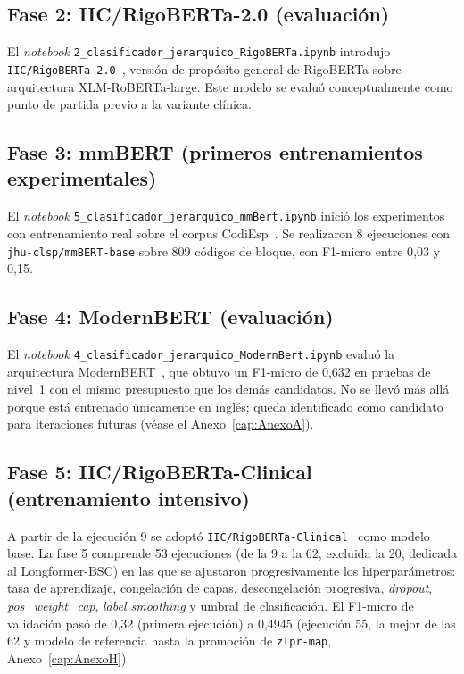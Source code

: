 \subsection{Fase 2: IIC/RigoBERTa-2.0 (evaluación)}

El \emph{notebook} \texttt{2\_\allowbreak{}clasificador\_\allowbreak{}jerarquico\_\allowbreak{}RigoBERTa.ipynb} introdujo \texttt{IIC/RigoBERTa-2.0}~\cite{vacaserrano2022rigoberta}, versión de propósito general de RigoBERTa sobre arquitectura XLM-RoBERTa-large. Este modelo se evaluó conceptualmente como punto de partida previo a la variante clínica.

\subsection{Fase 3: mmBERT (primeros entrenamientos experimentales)}

El \emph{notebook} \texttt{5\_\allowbreak{}clasificador\_\allowbreak{}jerarquico\_\allowbreak{}mmBert.ipynb} inició los experimentos con entrenamiento real sobre el corpus CodiEsp~\cite{miranda2020}. Se realizaron 8 ejecuciones con \texttt{jhu-clsp/mmBERT-base} sobre 809 códigos de bloque, con F1-micro entre 0{,}03 y 0{,}15.

\subsection{Fase 4: ModernBERT (evaluación)}

El \emph{notebook} \texttt{4\_\allowbreak{}clasificador\_\allowbreak{}jerarquico\_\allowbreak{}ModernBert.ipynb} evaluó la arquitectura ModernBERT~\cite{warner2024modernbert}, que obtuvo un F1-micro de 0{,}632 en pruebas de nivel~1 con el mismo presupuesto que los demás candidatos. No se llevó más allá porque está entrenado únicamente en inglés; queda identificado como candidato para iteraciones futuras (véase el Anexo~\ref{cap:AnexoA}).

\subsection{Fase 5: IIC/RigoBERTa-Clinical (entrenamiento intensivo)}

A partir de la ejecución 9 se adoptó \texttt{IIC/RigoBERTa-Clinical}~\cite{garciasubies2026rigobertaclinical} como modelo base. La fase 5 comprende 53 ejecuciones (de la 9 a la 62, excluida la 20, dedicada al Longformer-BSC) en las que se ajustaron progresivamente los hiperparámetros: tasa de aprendizaje, congelación de capas, descongelación progresiva, \emph{dropout}, \emph{pos\_weight\_cap}, \emph{label smoothing} y umbral de clasificación. El F1-micro de validación pasó de 0{,}32 (primera ejecución) a 0{,}4945 (ejecución 55, la mejor de las 62 y modelo de referencia hasta la promoción de \texttt{zlpr-map}, Anexo~\ref{cap:AnexoH}).

